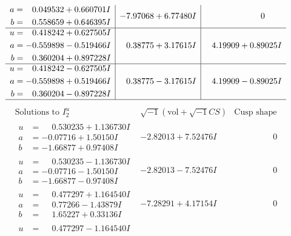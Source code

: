 \documentclass[1p]{elsarticle_modified}
\theoremstyle{definition}
\newcommand{\I}{\sqrt{-1}}
\begin{document}
$$\begin{array}{c|c|c}
\begin{aligned}
a &= \phantom{-}0.049532 + 0.660701 I \\
b &= \phantom{-}0.558659 + 0.646395 I\end{aligned}
 & -7.97068 + 6.77480 I & \phantom{-0.000000 } 0 \\ \hline\begin{aligned}
u &= \phantom{-}0.418242 + 0.627505 I \\
a &= -0.559898 - 0.519466 I \\
b &= \phantom{-}0.360204 + 0.897228 I\end{aligned}
 & \phantom{-}0.38775 + 3.17615 I & \phantom{-}4.19909 + 0.89025 I \\ \hline\begin{aligned}
u &= \phantom{-}0.418242 - 0.627505 I \\
a &= -0.559898 + 0.519466 I \\
b &= \phantom{-}0.360204 - 0.897228 I\end{aligned}
 & \phantom{-}0.38775 - 3.17615 I & \phantom{-}4.19909 - 0.89025 I\\
 \hline 
 \end{array}$$\newpage$$\begin{array}{c|c|c}  
\text{Solutions to }I^u_{2}& \I (\text{vol} + \sqrt{-1}CS) & \text{Cusp shape}\\
 \hline 
\begin{aligned}
u &= \phantom{-}0.530235 + 1.136730 I \\
a &= -0.07716 + 1.50150 I \\
b &= -1.66877 + 0.97408 I\end{aligned}
 & -2.82013 + 7.52476 I & \phantom{-0.000000 } 0 \\ \hline\begin{aligned}
u &= \phantom{-}0.530235 - 1.136730 I \\
a &= -0.07716 - 1.50150 I \\
b &= -1.66877 - 0.97408 I\end{aligned}
 & -2.82013 - 7.52476 I & \phantom{-0.000000 } 0 \\ \hline\begin{aligned}
u &= \phantom{-}0.477297 + 1.164540 I \\
a &= \phantom{-}0.77266 - 1.43879 I \\
b &= \phantom{-}1.65227 + 0.33136 I\end{aligned}
 & -7.28291 + 4.17154 I & \phantom{-0.000000 } 0 \\ \hline\begin{aligned}
u &= \phantom{-}0.477297 - 1.164540 I \\

\end{aligned}
\end{array}$$
\end{document}
